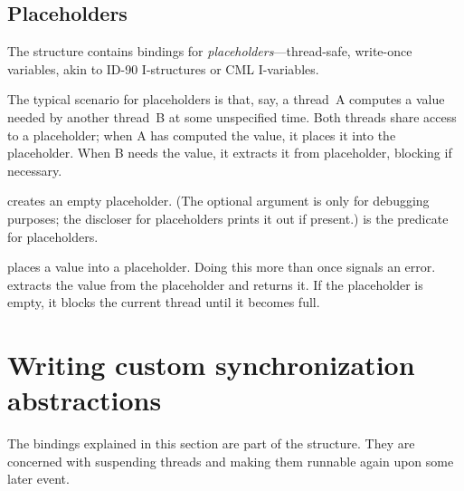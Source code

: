 \subsection{Placeholders}
\label{placeholders}

The  structure contains bindings for
\textit{placeholders}---thread-safe, write-once variables, akin to
ID-90 I-structures or CML I-variables.

The typical scenario for placeholders is that, say, a thread~A
computes a value needed by another thread~B at some unspecified time.
Both threads share access to a placeholder; when A has computed the
value, it places it into the placeholder.  When B needs the value, it
extracts it from placeholder, blocking if necessary.
%
\begin{protos}
\end{protos}
%
 creates an empty placeholder.  (The optional
 argument is only for debugging purposes; the discloser for
placeholders prints it out if present.)   is the
predicate for placeholders.

 places a value into a placeholder.  Doing this
more than once signals an error.   extracts
the value from the placeholder and returns it.  If the placeholder is
empty, it blocks the current thread until it becomes full.



\section{Writing custom synchronization abstractions}

The bindings explained in this section are part of the
 structure.  They are concerned with suspending
threads and making them runnable again upon some later event.


